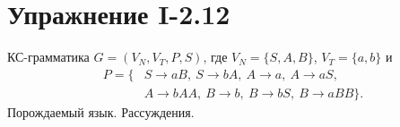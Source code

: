 \documentclass[12pt, oneside]{memoir}
\begin{document}
\section*{Упражнение I-2.12}
\begin{solution}
    {КС-грамматика $G = (V_N, V_T, P, S)$, где $V_N = \{S, A, B\}$, $V_T = \{a, b\}$ и
        \begin{align*}
            P =\{ & S \to aB,\ S \to bA,\ A \to a,\ A \to aS,     \\
                  & A \to bAA,\ B \to b,\ B \to bS,\ B \to aBB\}.
        \end{align*}}
    {Порождаемый язык.}
    {Рассуждения.}

\end{solution}

\end{document}
